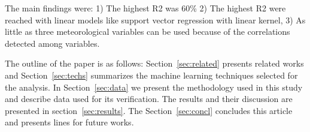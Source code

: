  The main findings were: 1) The highest R2 was 60\% 2) The highest R2 
 were reached with linear models like support vector regression with 
 linear kernel, 3) As little as three meteorological variables can 
 be used because of the correlations detected among variables. 

The outline of the paper is as follows: Section~\ref{sec:related}
presents related works and Section~\ref{sec:techs} summarizes the
machine learning techniques selected for the analysis. In
Section~\ref{sec:data} we present the methodology used in this study
and describe data used for its verification.  The results and their
discussion are presented in section~\ref{sec:results}.  The
Section~\ref{sec:concl} concludes this article and presents lines for
future works.
%
